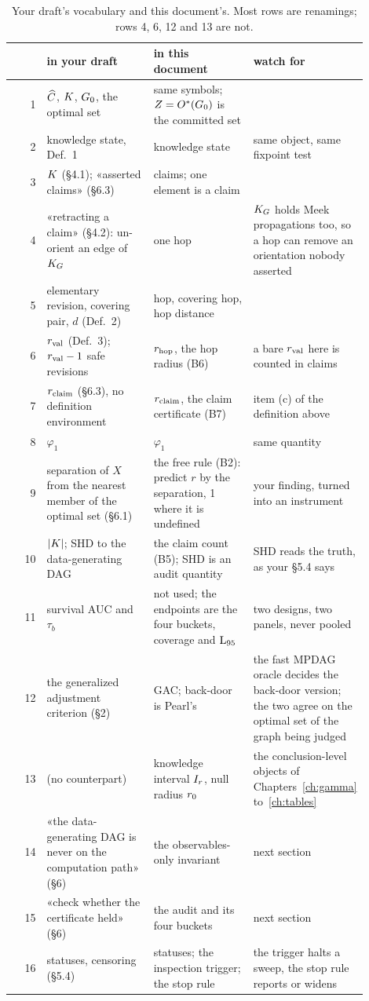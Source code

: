 \begin{table}[htbp]
\centering\footnotesize
\caption{Your draft's vocabulary and this document's. Most rows are renamings; rows 4, 6, 12 and 13
are not.}
\label{tab:vocab-map}
\begin{tabular}{@{}rp{0.30\linewidth}p{0.29\linewidth}p{0.31\linewidth}@{}}
\toprule
& in your draft & in this document & watch for \\
\midrule
1 & $\widehat{C}$, $K$, $G_0$, the optimal set & same symbols; $Z = O^{*}(G_0)$ is the committed set & \\
2 & knowledge state, Def.~1 & knowledge state & same object, same fixpoint test \\
3 & $K$ (\S4.1); «asserted claims» (\S6.3) & claims; one element is a claim & \\
4 & «retracting a claim» (\S4.2): un-orient an edge of $K_G$ & one hop & $K_G$ holds Meek propagations too, so a hop can remove an orientation nobody asserted \\
5 & elementary revision, covering pair, $d$ (Def.~2) & hop, covering hop, hop distance & \\
6 & $r_{\mathrm{val}}$ (Def.~3); $r_{\mathrm{val}} - 1$ safe revisions & $r_{\mathrm{hop}}$, the hop radius (B6) & a bare $r_{\mathrm{val}}$ here is counted in claims \\
7 & $r_{\mathrm{claim}}$ (\S6.3), no definition environment & $r_{\mathrm{claim}}$, the claim certificate (B7) & item (c) of the definition above \\
8 & $\varphi_1$ & $\varphi_1$ & same quantity \\
9 & separation of $X$ from the nearest member of the optimal set (\S6.1) & the free rule (B2): predict $r$ by the separation, 1 where it is undefined & your finding, turned into an instrument \\
10 & $|K|$; SHD to the data-generating DAG & the claim count (B5); SHD is an audit quantity & SHD reads the truth, as your \S5.4 says \\
11 & survival AUC and $\tau_b$ & not used; the endpoints are the four buckets, coverage and $\mathrm{L}_{95}$ & two designs, two panels, never pooled \\
12 & the generalized adjustment criterion (\S2) & GAC; back-door is Pearl's & the fast MPDAG oracle decides the back-door version; the two agree on the optimal set of the graph being judged \\
13 & (no counterpart) & knowledge interval $I_{r}$, null radius $r_{0}$ & the conclusion-level objects of Chapters~\ref{ch:gamma} to~\ref{ch:tables} \\
14 & «the data-generating DAG is never on the computation path» (\S6) & the observables-only invariant & next section \\
15 & «check whether the certificate held» (\S6) & the audit and its four buckets & next section \\
16 & statuses, censoring (\S5.4) & statuses; the inspection trigger; the stop rule & the trigger halts a sweep, the stop rule reports or widens \\
\bottomrule
\end{tabular}
\end{table}

